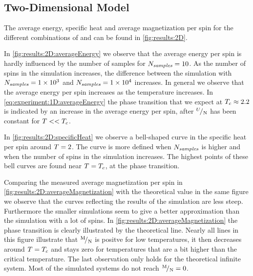 \subsection{Two-Dimensional Model}
\label{ss:results:2D}
	The average energy, specific heat and average magnetization per spin for the different combinations of \numberOfSpins and \numberOfSamples can be found in \cref{fig:results:2D}. 

	In \cref{fig:results:2D:averageEnergy} we observe that the average energy per spin is hardly influenced by the number of samples for $N_\textit{samples} = 10$. As the number of spins in the simulation increases, the difference between the simulation with $N_\textit{samples} = \num{1.e+3}$ and $N_\textit{samples} = \num{1.e+4}$ increases. In general we observe that the average energy per spin increases as the temperature increases. In \cref{eq:experiment:1D:averageEnergy} the phase transition that we expect at $T_{c} \approx \num{2.2}$ is indicated by an increase in the average energy per spin, after ${}^{U}\!/_{\mathrm{N}}$ has been constant for $T << T_{c}$. 

	In \cref{fig:results:2D:specificHeat} we observe a bell-shaped curve in the specific heat per spin around $T = 2$. The curve is more defined when $N_\textit{samples}$ is higher and when the number of spins in the simulation increases. The highest points of these bell curves are found near $T = T_{c}$, \ie at the phase transition.

	Comparing the measured average magnetization per spin in \cref{fig:results:2D:averageMagnetization} with the theoretical value in the same figure we observe that the curves reflecting the results of the simulation are less steep. Furthermore the smaller simulations seem to give a better approximation than the simulation with a lot of spins. In \cref{fig:results:2D:averageMagnetization} the phase transition is clearly illustrated by the theoretical line. Nearly all lines in this figure illustrate that ${}^{\mathrm{M}}\!/_{\mathrm{N}}$ is positve for low temperatures, it then decreases around $T = T_{c}$ and stays zero for temperatures that are a bit higher than the critical temperature. The last observation only holds for the theoretical infinite system. Most of the simulated systems do not reach ${}^{\mathrm{M}}\!/_{\mathrm{N}} = 0$.

